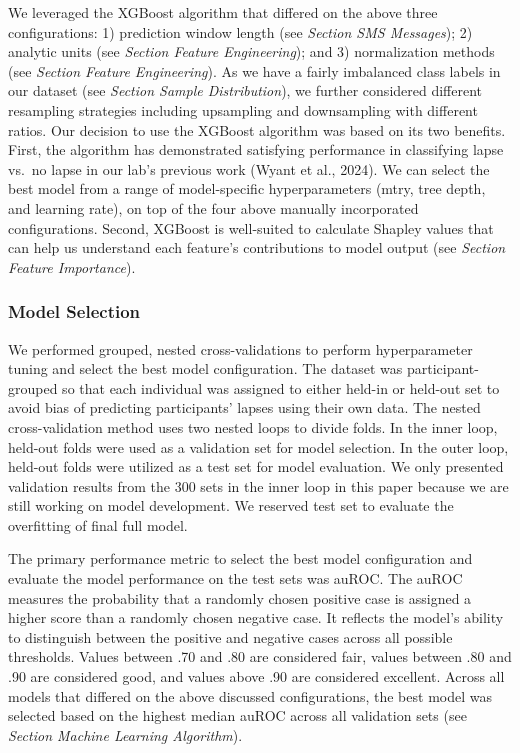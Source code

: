 \documentclass[
  letterpaper,
  DIV=11,
  numbers=noendperiod]{scrartcl}
\begin{document}
We leveraged the XGBoost algorithm that differed on the above three
configurations: 1) prediction window length (see \emph{Section SMS
Messages}); 2) analytic units (see \emph{Section Feature Engineering});
and 3) normalization methods (see \emph{Section Feature Engineering}).
As we have a fairly imbalanced class labels in our dataset (see
\emph{Section Sample Distribution}), we further considered different
resampling strategies including upsampling and downsampling with
different ratios. Our decision to use the XGBoost algorithm was based on
its two benefits. First, the algorithm has demonstrated satisfying
performance in classifying lapse vs.~no lapse in our lab's previous work
(Wyant et al., 2024). We can select the best model from a range of
model-specific hyperparameters (mtry, tree depth, and learning rate), on
top of the four above manually incorporated configurations. Second,
XGBoost is well-suited to calculate Shapley values that can help us
understand each feature's contributions to model output (see
\emph{Section Feature Importance}).

\subsubsection{Model Selection}\label{model-selection}

We performed grouped, nested cross-validations to perform hyperparameter
tuning and select the best model configuration. The dataset was
participant-grouped so that each individual was assigned to either
held-in or held-out set to avoid bias of predicting participants' lapses
using their own data. The nested cross-validation method uses two nested
loops to divide folds. In the inner loop, held-out folds were used as a
validation set for model selection. In the outer loop, held-out folds
were utilized as a test set for model evaluation. We only presented
validation results from the 300 sets in the inner loop in this paper
because we are still working on model development. We reserved test set
to evaluate the overfitting of final full model.

The primary performance metric to select the best model configuration
and evaluate the model performance on the test sets was auROC. The auROC
measures the probability that a randomly chosen positive case is
assigned a higher score than a randomly chosen negative case. It
reflects the model's ability to distinguish between the positive and
negative cases across all possible thresholds. Values between .70 and
.80 are considered fair, values between .80 and .90 are considered good,
and values above .90 are considered excellent. Across all models that
differed on the above discussed configurations, the best model was
selected based on the highest median auROC across all validation sets
(see \emph{Section Machine Learning Algorithm}).
\end{document}
